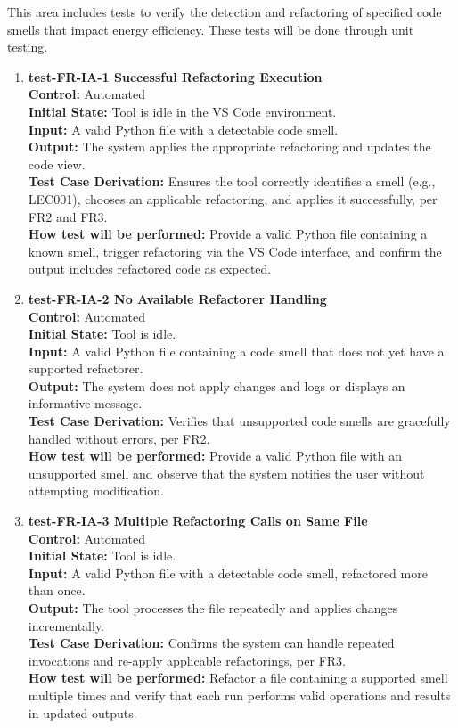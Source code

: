 \documentclass[12pt, titlepage]{article}
\begin{document}
This area includes tests to verify the detection and refactoring of specified code smells that impact energy efficiency. These tests will be done through unit testing.

\begin{enumerate}
  \item \textbf{test-FR-IA-1 Successful Refactoring Execution} \\[2mm]
    \textbf{Control:} Automated \\
    \textbf{Initial State:} Tool is idle in the VS Code environment. \\
    \textbf{Input:} A valid Python file with a detectable code smell. \\
    \textbf{Output:} The system applies the appropriate refactoring and updates the code view. \\
    \textbf{Test Case Derivation:} Ensures the tool correctly identifies a smell (e.g., LEC001), chooses an applicable refactoring, and applies it successfully, per FR2 and FR3. \\
    \textbf{How test will be performed:} Provide a valid Python file containing a known smell, trigger refactoring via the VS Code interface, and confirm the output includes refactored code as expected.

  \item \textbf{test-FR-IA-2 No Available Refactorer Handling} \\[2mm]
    \textbf{Control:} Automated \\
    \textbf{Initial State:} Tool is idle. \\
    \textbf{Input:} A valid Python file containing a code smell that does not yet have a supported refactorer. \\
    \textbf{Output:} The system does not apply changes and logs or displays an informative message. \\
    \textbf{Test Case Derivation:} Verifies that unsupported code smells are gracefully handled without errors, per FR2. \\
    \textbf{How test will be performed:} Provide a valid Python file with an unsupported smell and observe that the system notifies the user without attempting modification.

  \item \textbf{test-FR-IA-3 Multiple Refactoring Calls on Same File} \\[2mm]
    \textbf{Control:} Automated \\
    \textbf{Initial State:} Tool is idle. \\
    \textbf{Input:} A valid Python file with a detectable code smell, refactored more than once. \\
    \textbf{Output:} The tool processes the file repeatedly and applies changes incrementally. \\
    \textbf{Test Case Derivation:} Confirms the system can handle repeated invocations and re-apply applicable refactorings, per FR3. \\
    \textbf{How test will be performed:} Refactor a file containing a supported smell multiple times and verify that each run performs valid operations and results in updated outputs.


\end{enumerate}
\end{document}
